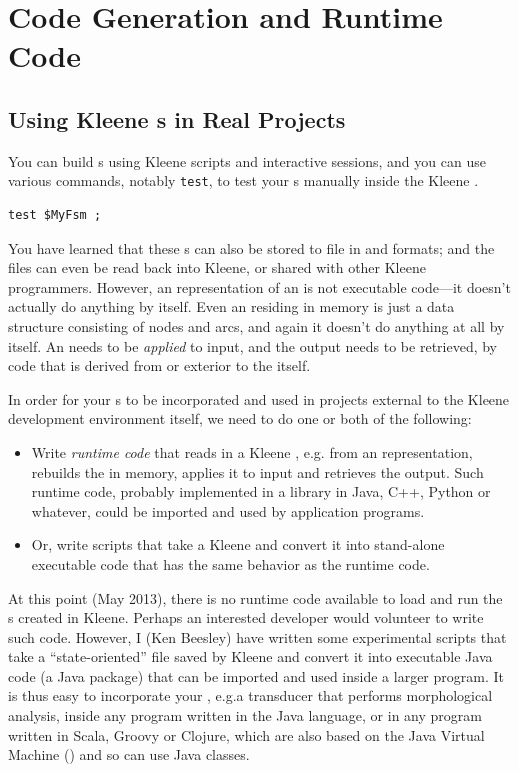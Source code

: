 \chapter{Code Generation and Runtime Code}

\label{chapt:coderuntime}

\section{Using Kleene \fsm{}s in Real Projects}

 
You can build \fsm{}s using Kleene scripts and interactive  sessions,
and you can
use various commands, notably \texttt{test}, to 
test your \fsm{}s manually inside the Kleene .


\begin{Verbatim}
test $MyFsm ;
\end{Verbatim}

\noindent
You have learned that these \fsm{}s can also be stored to file in  and \xml{}
formats; and the \xml{} files can even be read back into Kleene, or shared with other
Kleene programmers.  However, an  representation of
an \fsm{} is not executable code---it doesn't actually do anything by itself.  Even an
\fsm{} residing in memory is just a data structure consisting of nodes and arcs, and again it
doesn't do anything at all by itself.  An \fsm{} needs to be \emph{applied} to input, and
the output needs to be retrieved, by code that is derived from or exterior to the \fsm{} itself.

In order for your \fsm{}s to
be incorporated and used in projects external to the Kleene development environment itself,
we need to do one or both of the following:

\begin{itemize}
\item
Write \emph{runtime code} that reads in a Kleene \fsm{}, e.g.\@
from an  representation, 
rebuilds the \fsm{} in memory, applies it to input and retrieves the output.
Such runtime code, probably implemented in a library in Java, C++, Python or whatever, could be
imported and used by application programs.
\item
Or, write scripts that take a Kleene \fsm{} and convert it into stand-alone
executable code that has the same behavior as the runtime code.
\end{itemize}

At this point (May 2013), there is no runtime code available to load and run the \fsm{}s created
in Kleene.  Perhaps an interested developer would volunteer to write such code.  However, I (Ken
Beesley) have written some experimental  scripts that take a ``state-oriented''
 file saved by Kleene and convert it into executable Java code (a Java package)
that can be imported
and used inside a larger program.  It is thus easy to incorporate your \fsm{}, e.g.\@ a
transducer that performs morphological analysis, inside any program written in the Java language,
or in any program written in Scala, Groovy or Clojure, which are also based on the Java Virtual Machine
() and so can use Java classes.

